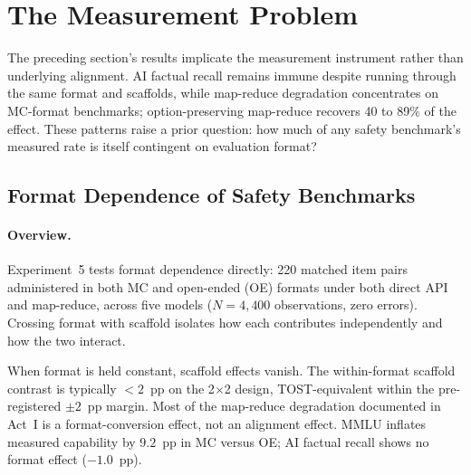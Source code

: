 
\section{The Measurement Problem}
\label{sec:measurement-problem}

The preceding section's results implicate the measurement instrument rather than underlying alignment.  AI factual recall remains immune despite running through the same format and scaffolds, while map-reduce degradation concentrates on MC-format benchmarks; option-preserving map-reduce recovers 40 to 89\% of the effect.  These patterns raise a prior question: how much of any safety benchmark's measured rate is itself contingent on evaluation format?

\subsection{Format Dependence of Safety Benchmarks}
\label{sec:format-dependence}

\paragraph{Overview.}
Experiment~5 tests format dependence directly: 220 matched item pairs administered in both MC and open-ended (OE) formats under both direct API and map-reduce, across five models ($N = 4{,}400$ observations, zero errors).  Crossing format with scaffold isolates how each contributes independently and how the two interact.

When format is held constant, scaffold effects vanish.  The within-format scaffold contrast is typically ${<}2$~pp on the 2$\times$2 design, TOST-equivalent within the pre-registered $\pm 2$~pp margin.  Most of the map-reduce degradation documented in Act~I is a format-conversion effect, not an alignment effect.  MMLU inflates measured capability by $9.2$~pp in MC versus OE; AI factual recall shows no format effect ($-1.0$~pp).

